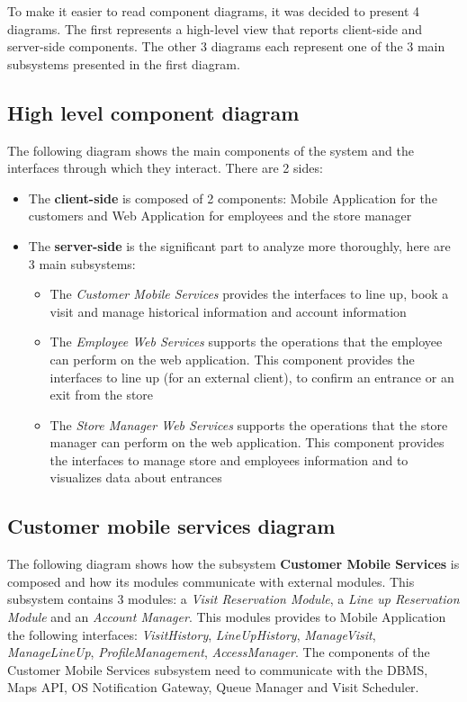 To make it easier to read component diagrams, it was decided to present 4 diagrams. The first represents a high-level view that reports client-side and server-side components. The other 3 diagrams each represent one of the 3 main subsystems presented in the first diagram.
\subsection{High level component diagram}
    The following diagram shows the main components of the system and the interfaces through which they interact. There are 2 sides:
    \begin{itemize}
        \item The \textbf{client-side} is composed of 2 components: Mobile Application for the customers and Web Application for employees and the store manager
        \item The \textbf{server-side} is the significant part to analyze more thoroughly, here are 3 main subsystems: \begin{itemize}
            \item The \textit{Customer Mobile Services} provides the interfaces to line up, book a visit and manage historical information and account information
            \item The \textit{Employee Web Services} supports the operations that the employee can perform on the web application. This component provides the interfaces to line up (for an external client), to confirm an entrance or an exit from the store
            \item The \textit{Store Manager Web Services} supports the operations that the store manager can perform on the web application. This component provides the interfaces to manage store and employees information and to visualizes data about entrances
        \end{itemize}
    \end{itemize}


\subsection{Customer mobile services diagram}

    The following diagram shows how the subsystem \textbf{Customer Mobile Services} is composed and how its modules communicate with external modules. This subsystem contains 3 modules: a \textit{Visit Reservation Module}, a \textit{Line up Reservation Module} and an \textit{Account Manager}. This modules provides to Mobile Application the following interfaces: \textit{VisitHistory}, \textit{LineUpHistory}, \textit{ManageVisit}, \textit{ManageLineUp}, \textit{ProfileManagement}, \textit{AccessManager}. The components of the Customer Mobile Services subsystem need to communicate with the DBMS, Maps API, OS Notification Gateway, Queue Manager and Visit Scheduler.

